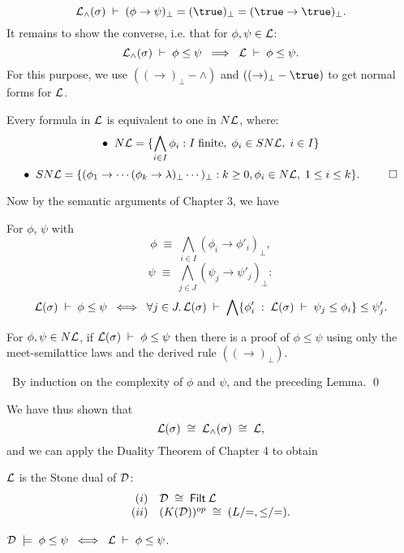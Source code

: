 \[ {\cal L}_{\wedge}(\sigma ) \; \vdash \; (\phi \rightarrow \psi )_{\bot} = (\true )_{\bot} = (\true \rightarrow \true )_{\bot} . \]
It remains to show the converse, i.e. that for $\phi , \psi \in {\cal L}$:
\[ {\cal L}_{\wedge}(\sigma ) \; \vdash \; \phi \leq \psi \;\; \Longrightarrow \;\; {\cal L} \; \vdash \; \phi \leq \psi . \]
For this purpose, we use $((\rightarrow )_{\bot}-\wedge )$ and $((\rightarrow )_{\bot}-\true )$ to get normal forms for $\cal L$.
\begin{lemma}
Every formula in $\cal L$ is equivalent to one in $N{\cal L}$, where:
\[ \bullet \;\; N{\cal L} = \{ \bigwedge_{i \in I} \phi_{i} : I \; {\rm finite}, \; \phi_{i} \in SN{\cal L}, \; i \in I \}\]
\[ \bullet \;\; SN{\cal L} = \{ (\phi_{1} \rightarrow \cdots (\phi_{k} \rightarrow \lambda )_{\bot} \cdots )_{\bot} : k \geq 0, \phi_{i} \in N{\cal L}, \; 1 \leq i \leq k \} . \;\; \qed \]
\end{lemma}
Now by the semantic arguments of Chapter 3, we have
\begin{lemma}
For $\phi$, $\psi$ with
\[ \phi \; \equiv \; \bigwedge_{i \in I} (\phi_{i} \rightarrow \phi'_{i})_{\bot}, \]
\[ \psi \; \equiv \; \bigwedge_{j \in J} (\psi_{j} \rightarrow \psi'_{j})_{\bot} : \]
\[ {\cal L}(\sigma ) \; \vdash \; \phi \leq \psi \;\; \Longleftrightarrow \;\; \forall j \in J.\, 
{\cal L}(\sigma ) \; \vdash \; \bigwedge \{ \phi'_{i} \; : \; {\cal L}(\sigma ) \; \vdash \; \psi_{j} \leq \phi_{i} \} \leq \psi'_{j} . \] 
\end{lemma}
\begin{proposition}
For $\phi , \psi \in N{\cal L}$, if ${\cal L}(\sigma ) \; \vdash \; \phi \leq \psi$ then there is a proof of $\phi \leq \psi$ using only the meet-semilattice laws and the derived rule $((\rightarrow )_{\bot})$.
\end{proposition}

\proof\ By induction on the complexity of $\phi$ and $\psi$, and the preceding Lemma. \qed

We have thus shown that 
\[ {\cal L}(\sigma ) \; \cong \; {\cal L}_{\wedge}(\sigma ) \; \cong \;
{\cal L} , \]
and we can apply the Duality Theorem of Chapter 4 to obtain
\begin{theorem}
$\cal L$ is the Stone dual of $\cal D$:
\[ \begin{array}{rl}
(i) & {\cal D} \; \cong \; {\sf Filt} \: {\cal L} \\
(ii) & (K({\cal D}))^{op} \; \cong \; (L/{=}, {\leq}/{=}). 
\end{array} \]
\end{theorem}
\begin{corollary}
${\cal D} \; \models \; \phi \leq \psi \;\; \Longleftrightarrow \;\; {\cal L} \; \vdash \; \phi \leq \psi$. 
\end{corollary}

